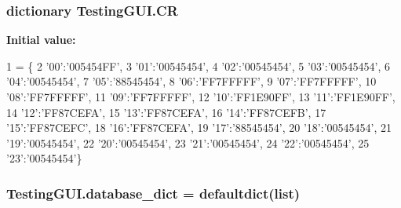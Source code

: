 \subsubsection[{\texorpdfstring{CR}{CR}}]{\setlength{\rightskip}{0pt plus 5cm}dictionary Testing\+G\+U\+I.\+CR}\hypertarget{namespaceTestingGUI_af38d10d3b8204ffbe61a4ec28c035776}{}\label{namespaceTestingGUI_af38d10d3b8204ffbe61a4ec28c035776}
{\bfseries Initial value\+:}
\begin{DoxyCode}
1 = \{
2 \textcolor{stringliteral}{'00'}:\textcolor{stringliteral}{'005454FF'},
3 \textcolor{stringliteral}{'01'}:\textcolor{stringliteral}{'00545454'},
4 \textcolor{stringliteral}{'02'}:\textcolor{stringliteral}{'00545454'},
5 \textcolor{stringliteral}{'03'}:\textcolor{stringliteral}{'00545454'},
6 \textcolor{stringliteral}{'04'}:\textcolor{stringliteral}{'00545454'},
7 \textcolor{stringliteral}{'05'}:\textcolor{stringliteral}{'88545454'},
8 \textcolor{stringliteral}{'06'}:\textcolor{stringliteral}{'FF7FFFFF'},
9 \textcolor{stringliteral}{'07'}:\textcolor{stringliteral}{'FF7FFFFF'},
10 \textcolor{stringliteral}{'08'}:\textcolor{stringliteral}{'FF7FFFFF'},
11 \textcolor{stringliteral}{'09'}:\textcolor{stringliteral}{'FF7FFFFF'},
12 \textcolor{stringliteral}{'10'}:\textcolor{stringliteral}{'FF1E90FF'},
13 \textcolor{stringliteral}{'11'}:\textcolor{stringliteral}{'FF1E90FF'},
14 \textcolor{stringliteral}{'12'}:\textcolor{stringliteral}{'FF87CEFA'},
15 \textcolor{stringliteral}{'13'}:\textcolor{stringliteral}{'FF87CEFA'},
16 \textcolor{stringliteral}{'14'}:\textcolor{stringliteral}{'FF87CEFB'},
17 \textcolor{stringliteral}{'15'}:\textcolor{stringliteral}{'FF87CEFC'},
18 \textcolor{stringliteral}{'16'}:\textcolor{stringliteral}{'FF87CEFA'},
19 \textcolor{stringliteral}{'17'}:\textcolor{stringliteral}{'88545454'},
20 \textcolor{stringliteral}{'18'}:\textcolor{stringliteral}{'00545454'},
21 \textcolor{stringliteral}{'19'}:\textcolor{stringliteral}{'00545454'},
22 \textcolor{stringliteral}{'20'}:\textcolor{stringliteral}{'00545454'},
23 \textcolor{stringliteral}{'21'}:\textcolor{stringliteral}{'00545454'},
24 \textcolor{stringliteral}{'22'}:\textcolor{stringliteral}{'00545454'},
25 \textcolor{stringliteral}{'23'}:\textcolor{stringliteral}{'00545454'}\}
\end{DoxyCode}
\subsubsection[{\texorpdfstring{database\+\_\+dict}{database_dict}}]{\setlength{\rightskip}{0pt plus 5cm}Testing\+G\+U\+I.\+database\+\_\+dict = defaultdict(list)}\hypertarget{namespaceTestingGUI_a5a1fe398b7a7e172a18aa44b2c1793f4}{}\label{namespaceTestingGUI_a5a1fe398b7a7e172a18aa44b2c1793f4}
